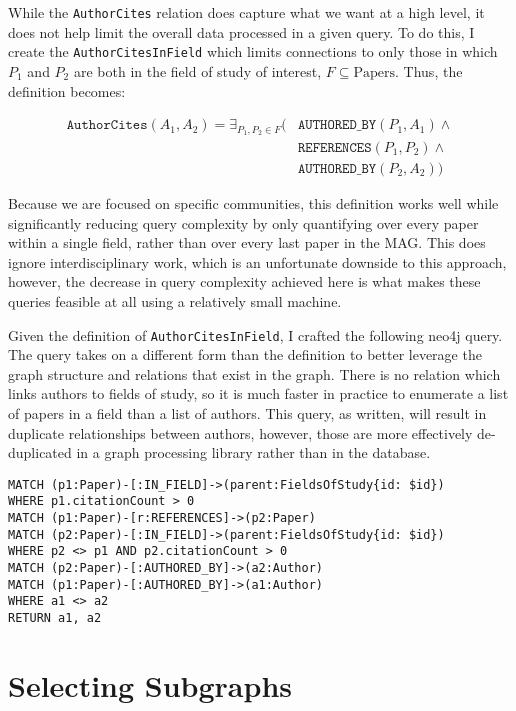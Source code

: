 While the \texttt{AuthorCites} relation does capture what we want at a
high level, it does not help limit the overall data processed in a given
query. To do this, I create the \texttt{AuthorCitesInField} which limits
connections to only those in which \(P_1\) and \(P_2\) are both in the
field of study of interest, \(F \subseteq \text{Papers}\). Thus, the
definition becomes:

\begin{align*}
\texttt{AuthorCites}(A_1, A_2) = \exists_{ P_1, P_2 \in F } (                &\texttt{AUTHORED\_BY} (P_1, A_1) \land \\
   &\texttt{REFERENCES}(P_1, P_2) \land \\
   &\texttt{AUTHORED\_BY}(P_2, A_2) )
\end{align*}

Because we are focused on specific communities, this definition works
well while significantly reducing query complexity by only quantifying
over every paper within a single field, rather than over every last
paper in the MAG. This does ignore interdisciplinary work, which is an
unfortunate downside to this approach, however, the decrease in query
complexity achieved here is what makes these queries feasible at all
using a relatively small machine.

Given the definition of \texttt{AuthorCitesInField}, I crafted the
following neo4j query. The query takes on a different form than the
definition to better leverage the graph structure and relations that
exist in the graph. There is no relation which links authors to fields
of study, so it is much faster in practice to enumerate a list of papers
in a field than a list of authors. This query, as written, will result
in duplicate relationships between authors, however, those are more
effectively de-duplicated in a graph processing library rather than in
the database.

\begin{verbatim}
MATCH (p1:Paper)-[:IN_FIELD]->(parent:FieldsOfStudy{id: $id})
WHERE p1.citationCount > 0
MATCH (p1:Paper)-[r:REFERENCES]->(p2:Paper)
MATCH (p2:Paper)-[:IN_FIELD]->(parent:FieldsOfStudy{id: $id})
WHERE p2 <> p1 AND p2.citationCount > 0
MATCH (p2:Paper)-[:AUTHORED_BY]->(a2:Author)
MATCH (p1:Paper)-[:AUTHORED_BY]->(a1:Author)
WHERE a1 <> a2
RETURN a1, a2
\end{verbatim}

\hypertarget{selecting-subgraphs}{%
\section{Selecting Subgraphs}\label{selecting-subgraphs}}

